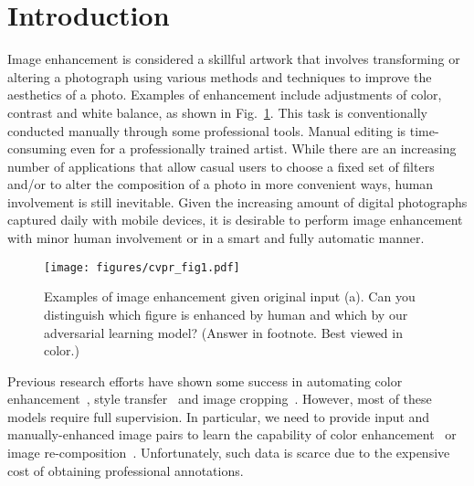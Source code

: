 \documentclass[sigconf]{acmart}
\begin{document}
\section{Introduction}
\label{sec:introduction}
Image enhancement is considered a skillful artwork that involves transforming or altering a photograph using various methods and techniques to improve the aesthetics of a photo. Examples of enhancement include adjustments of color, contrast and white balance, as shown in Fig.~\ref{fig:fig1}. 
This task is conventionally conducted manually through some professional tools. Manual editing is time-consuming even for a professionally trained artist. 
While there are an increasing number of applications that allow casual users to choose a fixed set of filters and/or to alter the composition of a photo in more convenient ways, human involvement is still inevitable. 
Given the increasing amount of digital photographs captured daily with mobile devices, it is desirable to perform image enhancement with minor human involvement or in a smart and fully automatic manner.
\begin{figure}[t]
\begin{center}
\texttt{[image: figures/cvpr\_fig1.pdf]}
\end{center}
\vskip -0.4cm
\caption[Caption for LOF]{Examples of image enhancement given original input (a). Can you distinguish which figure is enhanced by human and which by our adversarial learning model? (Answer in footnote\protect\footnotemark. Best viewed in color.)}\color{black}
\vskip -0.5cm
\label{fig:fig1}
\end{figure}
Previous research efforts have shown some success in automating color enhancement~\cite{bhattacharya2010framework,lee2016automatic,sun2016photo,yan2014learning}, style transfer~\cite{gupta2017characterizing,huang2017arbitrary,johnson2016perceptual} and image cropping~\cite{chen2016automatic,chen2017quantitative,yan2013learning}. However, most of these models require full supervision. 
In particular, we need to provide input and manually-enhanced image pairs to learn the capability of color enhancement~\cite{yan2016automatic} or image re-composition~\cite{huang2015automatic,chen2016automatic,yan2013learning}. Unfortunately, such data is scarce due to the expensive cost of obtaining professional annotations. 
\end{document}

